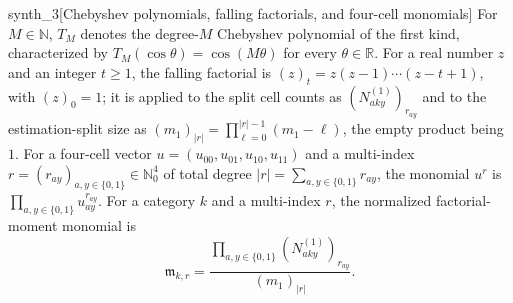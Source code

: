 \documentclass[11pt]{article}
\begin{document}
\begin{definitionv}{synth_3}[Chebyshev polynomials, falling factorials, and four-cell monomials]
For \(M\in\mathbb N\), \(T_M\) denotes the degree-\(M\) Chebyshev polynomial of the first kind, characterized by \(T_M(\cos\theta)=\cos(M\theta)\) for every \(\theta\in\mathbb R\). For a real number \(z\) and an integer \(t\ge1\), the falling factorial is \((z)_t=z(z-1)\cdots(z-t+1)\), with \((z)_0=1\); it is applied to the split cell counts as \((N^{(1)}_{aky})_{r_{ay}}\) and to the estimation-split size as \((m_1)_{|r|}=\prod_{\ell=0}^{|r|-1}(m_1-\ell)\), the empty product being \(1\). For a four-cell vector \(u=(u_{00},u_{01},u_{10},u_{11})\) and a multi-index \(r=(r_{ay})_{a,y\in\{0,1\}}\in\mathbb N_0^4\) of total degree \(|r|=\sum_{a,y\in\{0,1\}}r_{ay}\), the monomial \(u^r\) is \(\prod_{a,y\in\{0,1\}}u_{ay}^{r_{ay}}\). For a category \(k\) and a multi-index \(r\), the normalized factorial-moment monomial is \[ \mathfrak m_{k,r} = \frac{\prod_{a,y\in\{0,1\}}(N^{(1)}_{aky})_{r_{ay}}}{(m_1)_{|r|}}. \]
\end{definitionv}
\end{document}
